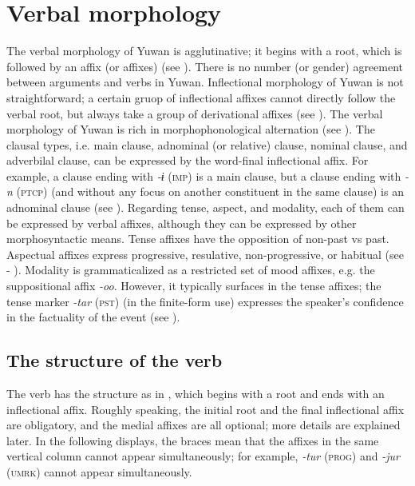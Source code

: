 \chapter{Verbal morphology}\label{chap:8}

The verbal morphology of Yuwan is agglutinative; it begins with a root, which is followed by an affix (or affixes) (see ). There is no number (or gender) agreement between arguments and verbs in Yuwan. Inflectional morphology of Yuwan is not straightforward; a certain gruop of inflectional affixes cannot directly follow the verbal root, but always take a group of derivational affixes (see ). The verbal morphology of Yuwan is rich in morphophonological alternation (see ). The clausal types, i.e. main clause, adnominal (or relative) clause, nominal clause, and adverbilal clause, can be expressed by the word-final inflectional affix. For example, a clause ending with \textit{{}-ɨ} (\textsc{imp}) is a main clause, but a clause ending with \textit{-n} (\textsc{ptcp}) (and without any focus on another constituent in the same clause) is an adnominal clause (see ). Regarding tense, aspect, and modality, each of them can be expressed by verbal affixes, although they can be expressed by other morphosyntactic means. Tense affixes have the opposition of non-past vs past. Aspectual affixes express progressive, resulative, non-progressive, or habitual (see  - ). Modality is grammaticalized as a restricted set of mood affixes, e.g. the suppositional affix \textit{{}-oo}. However, it typically surfaces in the tense affixes; the tense marker \textit{-tar} (\textsc{pst}) (in the finite-form use) expresses the speaker’s confidence in the factuality of the event (see ).

\section{The structure of the verb}
\label{bkm:Ref303739828}
The verb has the structure as in , which begins with a root and ends with an inflectional affix. Roughly speaking, the initial root and the final inflectional affix are obligatory, and the medial affixes are all optional; more details are explained later. In the following displays, the braces mean that the affixes in the same vertical column cannot appear simultaneously; for example, \textit{{}-tur} (\textsc{prog}) and \textit{{}-jur} (\textsc{umrk}) cannot appear simultaneously.

